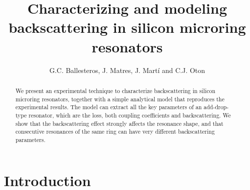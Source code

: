 \documentclass[10pt,letterpaper]{article}
\begin{document}
\title{Characterizing and modeling backscattering in silicon microring resonators}

\author{G.C. Ballesteros, J. Matres, J. Mart\'i and C.J. Oton}

\address{Nanophotonics Technology Center, \\ Universidad Polit\'ecnica de Valencia, Camino de Vera s/n, 46022, Valencia, Spain}




\begin{abstract}


We present an experimental technique to characterize backscattering in silicon microring resonators, together with a simple analytical model that reproduces the experimental results. The model can extract all the key parameters of an add-drop-type resonator, which are the loss, both coupling coefficients and backscattering. We show that the backscattering effect strongly affects the resonance shape, and that consecutive resonances of the same ring can have very different backscattering parameters.
\end{abstract}





\section{Introduction}
\end{document}
